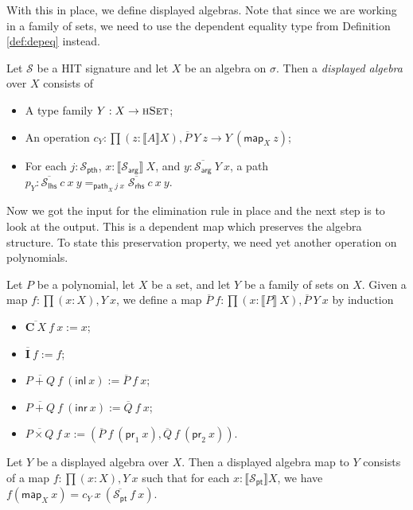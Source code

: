 \documentclass[9pt]{entcs}
\newcommand{\type}[1]{\textsc{#1}}
\newcommand{\term}[1]{\mathsf{#1}}
\newcommand{\constructor}[1]{\mathbf{#1}}
\newcommand{\function}[1]{\mathsf{#1}}
\newcommand{\deprod}[3]{\prod(#1 : #2), #3} %
\newcommand{\hset}{\type{hSet}} %
\newcommand{\0}{\textbf{0}} %
\newcommand{\1}{\textbf{1}} %
\newcommand{\inl}{\term{inl}} %
\newcommand{\inr}{\term{inr}} %
\newcommand{\prl}{\term{pr}_1} %
\newcommand{\prr}{\term{pr}_2} %
\newcommand{\depeq}[3]{#2 =_{#1} #3} %
\newcommand{\Def}{:=} %
\newcommand{\C}{\constructor{C}} %
\newcommand{\I}{\constructor{I}} %
\newcommand{\sumP}[2]{#1 + #2} %
\newcommand{\prodP}[2]{#1 \times #2} %
\newcommand{\pt}[0]{\textsf{pt}}
\newcommand{\pthI}[0]{\textsf{pth}}
\newcommand{\pthA}[0]{\textsf{arg}}
\newcommand{\pthlh}[0]{\textsf{lhs}}
\newcommand{\pthrh}[0]{\textsf{rhs}}
\newcommand{\pointc}[1]{#1_{\pt}} %
\newcommand{\pathI}[1]{#1_{\pthI}} %
\newcommand{\pathA}[1]{#1_{\pthA}} %
\newcommand{\pathlh}[1]{#1_{\pthlh}} %
\newcommand{\pathrh}[1]{#1_{\pthrh}} %
\newcommand{\sig}{\mathcal{S}} %
\newcommand{\semP}[1]{\llbracket #1 \rrbracket} %
\newcommand{\constrA}[1]{\function{map}_{#1}} %
\newcommand{\constrP}[1]{\function{path}_{#1}} %
\newcommand{\polydact}[2]{\overline{#1} \> #2} %
\newcommand{\epdact}[2]{\overline{#1} \> #2} %
\newcommand{\polydmap}[2]{\overline{#1} \> #2} %
\begin{document}
With this in place, we define displayed algebras.
Note that since we are working in a family of sets, we need to use the dependent equality type from Definition \ref{def:depeq} instead.

\begin{definition}
Let $\sig$ be a HIT signature and let $X$ be an algebra on $\sigma$.
Then a \emph{displayed algebra} over $X$ consists of
\begin{itemize}
	\item A type family $Y : X \rightarrow \hset$;
	\item An operation $c_Y : \deprod{z}{\semP{A}{X}}{\polydact{P}{Y} \> z \rightarrow Y \> (\constrA{X} \> z)}$;
	\item For each $j : \pathI{\sig}$, $x : \semP{\pathA{\sig}} \> X$, and $y : \polydact{\pathA{\sig}}{Y} \> x$,  a path $p_Y : \depeq{\constrP{X} \> j \> x}{\epdact{\pathlh{\sig}}{c} \> x \> y}{\epdact{\pathrh{\sig}}{c} \> x \> y}$.
\end{itemize} 
\end{definition}

Now we got the input for the elimination rule in place and the next step is to look at the output.
This is a dependent map which preserves the algebra structure.
To state this preservation property, we need yet another operation on polynomials.

\begin{definition}
Let $P$ be a polynomial, let $X$ be a set, and let $Y$ be a family of sets on $X$.
Given a map $f : \deprod{x}{X}{Y \> x}$, we define a map $\polydmap{P}{f} : \deprod{x}{\semP{P} \> X}{\polydact{P}{Y} \> x}$ by induction
\begin{itemize}
	\item $\polydmap{\C \> X}{f} \> x \Def x$;
	\item $\polydmap{\I}{f} \Def f$;
	\item $\polydmap{\sumP{P}{Q}}{f} \> (\inl \> x) \Def \polydmap{P}{f} \> x$;
	\item $\polydmap{\sumP{P}{Q}}{f} \> (\inr \> x) \Def \polydmap{Q}{f} \> x$;
	\item $\polydmap{\prodP{P}{Q}}{f} \> x \Def (\polydact{P}{f} \> (\prl \> x) , \polydact{Q}{f} \> (\prr \> x))$.
\end{itemize}
\end{definition}

\begin{definition}
Let $Y$ be a displayed algebra over $X$.
Then a displayed algebra map to $Y$ consists of a map $f : \deprod{x}{X}{Y \> x}$ such that for each $x : \semP{\pointc{\sig}}{X}$, we have $f(\constrA{X} \> x) = c_Y \> x \> (\polydmap{\pointc{\sig}}{f} \> x)$.
\end{definition}
\end{document}
